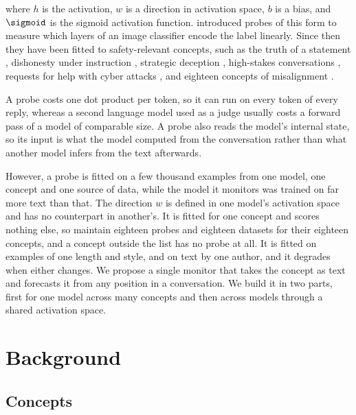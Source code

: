 \documentclass{article}
\begin{document}
where $h$ is the activation, $w$ is a direction in activation space, $b$ is a bias, and $\sigmoid$ is the sigmoid activation function. \cite{alain2016} introduced probes of this form to measure which layers of an image classifier encode the label linearly. Since then they have been fitted to safety-relevant concepts, such as the truth of a statement \citep{burns2022,marks2023}, dishonesty under instruction \citep{zou2023}, strategic deception \citep{goldowskydill2025}, high-stakes conversations \citep{mckenzie2025}, requests for help with cyber attacks \citep{kramar2026}, and eighteen concepts of misalignment \citep{zhou2026}.

A probe costs one dot product per token, so it can run on every token of every reply, whereas a second language model used as a judge usually costs a forward pass of a model of comparable size. A probe also reads the model's internal state, so its input is what the model computed from the conversation rather than what another model infers from the text afterwards.

However, a probe is fitted on a few thousand examples from one model, one concept and one source of data, while the model it monitors was trained on far more text than that. The direction $w$ is defined in one model's activation space and has no counterpart in another's. It is fitted for one concept and scores nothing else, so \cite{zhou2026} maintain eighteen probes and eighteen datasets for their eighteen concepts, and a concept outside the list has no probe at all. It is fitted on examples of one length and style, and on text by one author, and it degrades when either changes. We propose a single monitor that takes the concept as text and forecasts it from any position in a conversation. We build it in two parts, first for one model across many concepts and then across models through a shared activation space.

\section{Background}

\subsection{Concepts}
\label{sec:concepts}
\end{document}
